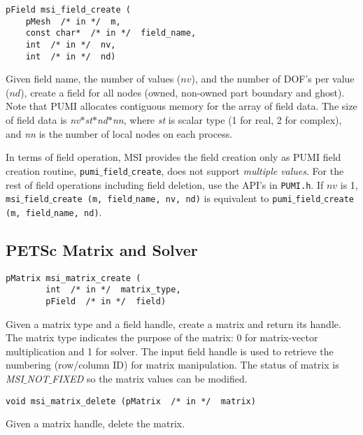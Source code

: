 \begin{verbatim}
pField msi_field_create (
    pMesh  /* in */  m,
    const char*  /* in */  field_name, 
    int  /* in */  nv, 
    int  /* in */  nd)
\end{verbatim}\vspace{-.5cm}\hspace{1cm}
Given field name, the number of values ($nv$), and the number of DOF's per value ($nd$), create a field for all nodes (owned, non-owned part boundary and ghost). Note that PUMI allocates contiguous memory for the array of field data. The size of field data is \textit{nv}$*$\textit{st}$*$\textit{nd}$*$\textit{nn}, where \textit{st} is scalar type (1 for real, 2 for complex), and \textit{nn} is the number of local nodes on each process.

In terms of field operation, MSI provides the field creation only as PUMI field creation routine, \texttt{pumi$\_$field$\_$create}, does not support \textit{multiple values}. For the rest of field operations including field deletion, use the API's in \texttt{PUMI.h}. If $nv$ is 1, \texttt{msi$\_$field$\_$create (m, field$\_$name, nv, nd)} is equivalent to \texttt{pumi$\_$field$\_$create (m, field$\_$name, nd)}.


\subsection{PETSc Matrix and Solver}

\begin{verbatim}
pMatrix msi_matrix_create (
        int  /* in */  matrix_type,
        pField  /* in */  field)
\end{verbatim}\vspace{-.5cm}\hspace{1cm}
Given a matrix type and a field handle, create a matrix and return its handle. The matrix type indicates the purpose of the matrix: 0 for matrix-vector multiplication and 1 for solver. The input field handle is used to retrieve the numbering (row/column ID) for matrix manipulation. The status of matrix is \textit{MSI$\_$NOT$\_$FIXED} so the matrix values can be modified.

\begin{verbatim}
void msi_matrix_delete (pMatrix  /* in */  matrix)
\end{verbatim}\vspace{-.5cm}\hspace{1cm}
Given a matrix handle, delete the matrix. 
	    
